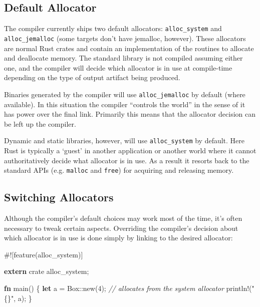\documentclass[a4paper,]{book}
\newenvironment{Shaded}{\begin{snugshade}}{\end{snugshade}}
\newcommand{\KeywordTok}[1]{\textcolor[rgb]{0.13,0.29,0.53}{\textbf{{#1}}}}
\newcommand{\DecValTok}[1]{\textcolor[rgb]{0.00,0.00,0.81}{{#1}}}
\newcommand{\StringTok}[1]{\textcolor[rgb]{0.31,0.60,0.02}{{#1}}}
\newcommand{\CommentTok}[1]{\textcolor[rgb]{0.56,0.35,0.01}{\textit{{#1}}}}
\newcommand{\OtherTok}[1]{\textcolor[rgb]{0.56,0.35,0.01}{{#1}}}
\newcommand{\NormalTok}[1]{{#1}}
\begin{document}
\subsection{Default Allocator}\label{default-allocator}

The compiler currently ships two default allocators:
\texttt{alloc\_system} and \texttt{alloc\_jemalloc} (some targets don't
have jemalloc, however). These allocators are normal Rust crates and
contain an implementation of the routines to allocate and deallocate
memory. The standard library is not compiled assuming either one, and
the compiler will decide which allocator is in use at compile-time
depending on the type of output artifact being produced.

Binaries generated by the compiler will use \texttt{alloc\_jemalloc} by
default (where available). In this situation the compiler ``controls the
world'' in the sense of it has power over the final link. Primarily this
means that the allocator decision can be left up the compiler.

Dynamic and static libraries, however, will use \texttt{alloc\_system}
by default. Here Rust is typically a `guest' in another application or
another world where it cannot authoritatively decide what allocator is
in use. As a result it resorts back to the standard APIs (e.g.
\texttt{malloc} and \texttt{free}) for acquiring and releasing memory.

\subsection{Switching Allocators}\label{switching-allocators}

Although the compiler's default choices may work most of the time, it's
often necessary to tweak certain aspects. Overriding the compiler's
decision about which allocator is in use is done simply by linking to
the desired allocator:

\begin{Shaded}
\begin{Highlighting}[]
\NormalTok{#![feature(alloc_system)]}

\KeywordTok{extern} \NormalTok{crate alloc_system;}

\KeywordTok{fn} \NormalTok{main() \{}
    \KeywordTok{let} \NormalTok{a = Box::new(}\DecValTok{4}\NormalTok{); }\CommentTok{// allocates from the system allocator}
    \OtherTok{println!}\NormalTok{(}\StringTok{"\{\}"}\NormalTok{, a);}
\NormalTok{\}}
\end{Highlighting}
\end{Shaded}
\end{document}
